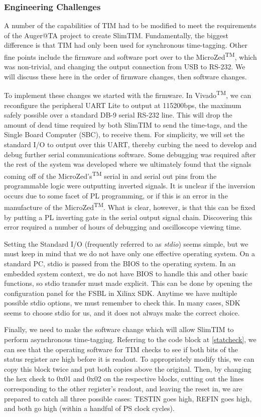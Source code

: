 \subsubsection{Engineering Challenges}
A number of the capabilities of TIM had to be modified to meet the requirements of the Auger@TA project to create SlimTIM. Fundamentally, the biggest difference is that TIM had only been used for synchronous time-tagging. Other fine points include the firmware and software port over to the MicroZed\textsuperscript{TM}, which was non-trivial, and changing the output connection from USB to RS-232. We will discuss these here in the order of firmware changes, then software changes. 

To implement these changes we started with the firmware. In Vivado\textsuperscript{TM}, we can reconfigure the peripheral UART Lite to output at 115200bps, the maximum safely possible over a standard DB-9 serial RS-232 line. This will drop the amount of dead time required by both SlimTIM to send the time-tags, and the Single Board Computer (SBC), to receive them. For simplicity, we will set the standard I/O to output over this UART, thereby curbing the need to develop and debug further serial communications software. Some debugging was required after the rest of the system was developed where we ultimately found that the signals coming off of the MicroZed's\textsuperscript{TM} serial in and serial out pins from the programmable logic were outputting inverted signals. It is unclear if the inversion occurs due to some facet of PL programming, or if this is an error in the manufacture of the MicroZed\textsuperscript{TM}. What is clear, however, is that this can be fixed by putting a PL inverting gate in the serial output signal chain. Discovering this error required a number of hours of debugging and oscilloscope viewing time. 

Setting the Standard I/O (frequently referred to as \textit{stdio}) seems simple, but we must keep in mind that we do not have only one effective operating system. On a standard PC, stdio is passed from the BIOS to the operating system. In an embedded system context, we do not have BIOS to handle this and other basic functions, so stdio transfer must made explicit. This can be done by opening the configuration panel for the FSBL in Xilinx SDK. Anytime we have multiple possible stdio options, we must remember to check this. In many cases, SDK seems to choose stdio for us, and it does not always make the correct choice.

Finally, we need to make the software change which will allow SlimTIM to perform asynchronous time-tagging. Referring to the code block at \ref{statcheck}, we can see that the operating software for TIM checks to see if both bits of the status register are high before it is readout. To appropriately modify this, we can copy this block twice and put both copies above the original. Then, by changing the hex check to 0x01 and 0x02 on the respective blocks, cutting out the lines corresponding to the other register's readout, and leaving the reset in, we are prepared to catch all three possible cases: TESTIN goes high, REFIN goes high, and both go high (within a handful of PS clock cycles). 


